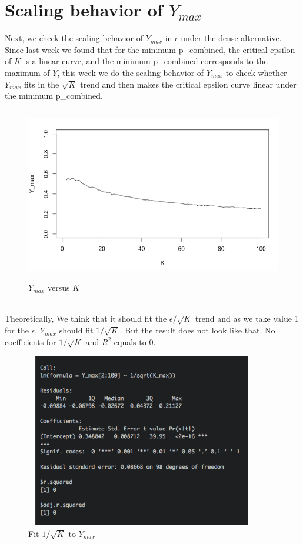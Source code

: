 \documentclass[10pt,english]{article}\usepackage{graphicx, color}
\numberwithin{equation}{section}
\numberwithin{figure}{section}
\begin{document}
\section{Scaling behavior of $Y_{max}$}
Next, we check the scaling behavior of $Y_{max}$ in $\epsilon$ under the dense alternative. Since last week we found that for the minimum p\_combined, the critical epsilon of $K$ is a linear curve, and the minimum p\_combined corresponds to the maximum of $Y$, this week we do the scaling behavior of $Y_{max}$ to check whether $Y_{max}$ fits in the $\sqrt{K}$ trend and then makes the critical epsilon curve linear under the minimum p\_combined.\\
\begin{figure}[htbp]
\centering\includegraphics[width=4.5in, height=3in]{max}
\caption{$Y_{max}$ versus $K$}
\end{figure}
\quad\\
Theoretically, We think that it should fit the $\epsilon/\sqrt{K}$ trend and as we take value 1 for the $\epsilon$, $Y_{max}$ should fit $1/\sqrt{K}$. But the result does not look like that. No coefficients for $1/\sqrt{K}$ and $R^2$ equals to 0.\\
\begin{figure}[htbp]
\centering\includegraphics[width=4in, height=3in]{sqrt}
\caption{Fit $1/\sqrt{K}$ to $Y_{max}$}
\end{figure}
\end{document}
